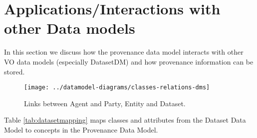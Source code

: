 \documentclass[11pt,a4paper]{ivoa}
\newcommand{\TODO}[1]{%
    \noindent%
    \colorbox{todocolor}{%
            \parbox{0.85\linewidth}{\sffamily \textbf{TODO:}\\
            #1}
    }%
    \vspace{2pt}

}
\begin{document}
\section{Applications/Interactions with other Data models}\label{sec:dmlinks}
In this section we discuss how the provenance data model interacts with
other VO data models (especially DatasetDM)
and how provenance information can be stored.


\begin{figure}[h]
\centering
\texttt{[image: ../datamodel-diagrams/classes-relations-dms]}
\caption{Links between Agent and Party, Entity and Dataset.}
\label{fig:class-relations-dm}
\end{figure}


Table \ref{tab:datasetmapping} maps classes and attributes from the Dataset Data Model to concepts in the Provenance Data Model.
\end{document}
